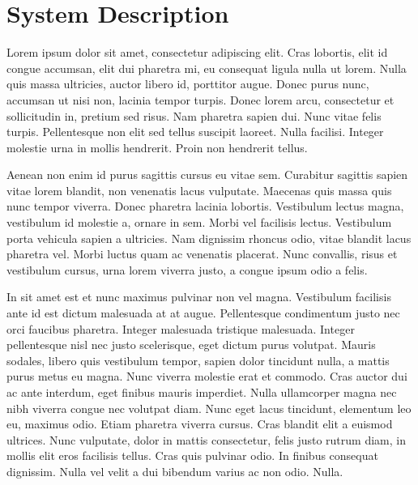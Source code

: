 \documentclass[a4paper]{article}
\begin{document}
\section{System Description}


Lorem ipsum dolor sit amet, consectetur adipiscing elit. Cras lobortis, elit id congue accumsan, elit dui pharetra mi, eu consequat ligula nulla ut lorem. Nulla quis massa ultricies, auctor libero id, porttitor augue. Donec purus nunc, accumsan ut nisi non, lacinia tempor turpis. Donec lorem arcu, consectetur et sollicitudin in, pretium sed risus. Nam pharetra sapien dui. Nunc vitae felis turpis. Pellentesque non elit sed tellus suscipit laoreet. Nulla facilisi. Integer molestie urna in mollis hendrerit. Proin non hendrerit tellus.

Aenean non enim id purus sagittis cursus eu vitae sem. Curabitur sagittis sapien vitae lorem blandit, non venenatis lacus vulputate. Maecenas quis massa quis nunc tempor viverra. Donec pharetra lacinia lobortis. Vestibulum lectus magna, vestibulum id molestie a, ornare in sem. Morbi vel facilisis lectus. Vestibulum porta vehicula sapien a ultricies. Nam dignissim rhoncus odio, vitae blandit lacus pharetra vel. Morbi luctus quam ac venenatis placerat. Nunc convallis, risus et vestibulum cursus, urna lorem viverra justo, a congue ipsum odio a felis.

In sit amet est et nunc maximus pulvinar non vel magna. Vestibulum facilisis ante id est dictum malesuada at at augue. Pellentesque condimentum justo nec orci faucibus pharetra. Integer malesuada tristique malesuada. Integer pellentesque nisl nec justo scelerisque, eget dictum purus volutpat. Mauris sodales, libero quis vestibulum tempor, sapien dolor tincidunt nulla, a mattis purus metus eu magna. Nunc viverra molestie erat et commodo. Cras auctor dui ac ante interdum, eget finibus mauris imperdiet. Nulla ullamcorper magna nec nibh viverra congue nec volutpat diam. Nunc eget lacus tincidunt, elementum leo eu, maximus odio. Etiam pharetra viverra cursus. Cras blandit elit a euismod ultrices. Nunc vulputate, dolor in mattis consectetur, felis justo rutrum diam, in mollis elit eros facilisis tellus. Cras quis pulvinar odio. In finibus consequat dignissim. Nulla vel velit a dui bibendum varius ac non odio. Nulla.
\end{document}
